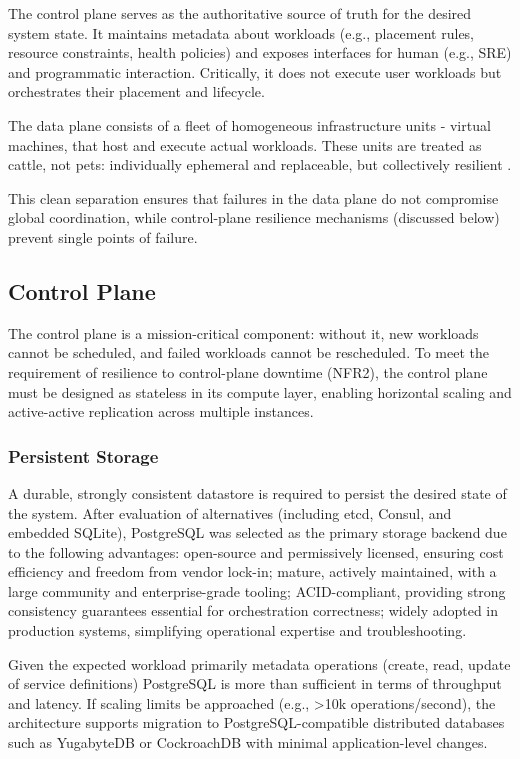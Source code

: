 The control plane serves as the authoritative source of truth for the desired system state. It maintains metadata about workloads (e.g., placement rules, resource constraints, health policies) and exposes interfaces for human (e.g., SRE) and programmatic interaction. Critically, it does not execute user workloads but orchestrates their placement and lifecycle. 

The data plane consists of a fleet of homogeneous infrastructure units - virtual machines, that host and execute actual workloads. These units are treated as cattle, not pets: individually ephemeral and replaceable, but collectively resilient \cite{pets_vs_cattle}.

This clean separation ensures that failures in the data plane do not compromise global coordination, while control-plane resilience mechanisms (discussed below) prevent single points of failure.

\subsection{Control Plane}

The control plane is a mission-critical component: without it, new workloads cannot be scheduled, and failed workloads cannot be rescheduled. To meet the requirement of resilience to control-plane downtime (NFR2), the control plane must be designed as stateless in its compute layer, enabling horizontal scaling and active-active replication across multiple instances.

\subsubsection{Persistent Storage}
A durable, strongly consistent datastore is required to persist the desired state of the system. After evaluation of alternatives (including etcd, Consul, and embedded SQLite), PostgreSQL was selected as the primary storage backend due to the following advantages: open-source and permissively licensed, ensuring cost efficiency and freedom from vendor lock-in; mature, actively maintained, with a large community and enterprise-grade tooling;
ACID-compliant, providing strong consistency guarantees essential for orchestration correctness; widely adopted in production systems, simplifying operational expertise and troubleshooting.

Given the expected workload primarily metadata operations (create, read, update of service definitions) PostgreSQL is more than sufficient in terms of throughput and latency. If scaling limits be approached (e.g., >10k operations/second), the architecture supports migration to PostgreSQL-compatible distributed databases such as YugabyteDB or CockroachDB with minimal application-level changes.

